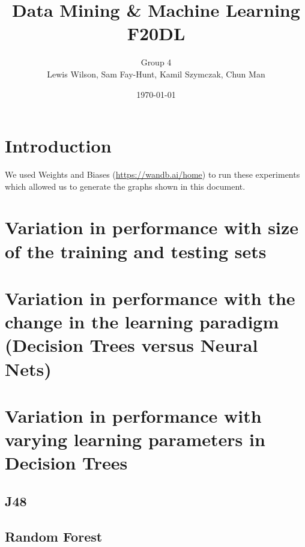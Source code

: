 \documentclass[11pt]{article}
\begin{document}
\title{\huge Data Mining \& Machine Learning F20DL} 
\author{Group 4\\Lewis Wilson, Sam Fay-Hunt, Kamil Szymczak, Chun Man }
\date{\today}
\maketitle

\newpage
\tableofcontents
\thispagestyle{empty}
\pagebreak
\setcounter{page}{1}
\newpage
\section{Introduction}
We used Weights and Biases (\url{https://wandb.ai/home}) to run these experiments which allowed us to generate the graphs shown in this document.


\newpage
\section{Variation in performance with size of the training and testing sets}

\newpage
\section{Variation in performance with the change in the learning paradigm (Decision Trees versus
Neural Nets)}

\newpage
\section{Variation in performance with varying learning parameters in Decision Trees}

\subsection{J48}



\newpage
\subsection{Random Forest}
\end{document}
